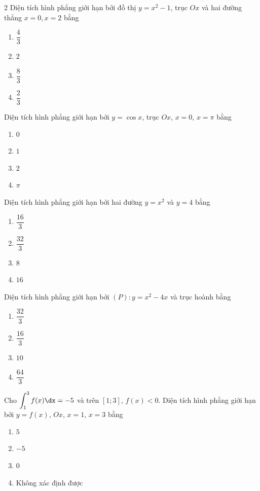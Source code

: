\begin{multicols}{2}
\cauhoi Diện tích hình phẳng giới hạn bởi đồ thị $y=x^2-1$, trục $Ox$ và hai đường thẳng $x=0,x=2$ bằng
\begin{enumerate}[label=\textbf{\Alph*.}, leftmargin=0.9cm]
  \item $\dfrac{4}{3}$
  \item $2$
  \item $\dfrac{8}{3}$
  \item $\dfrac{2}{3}$
\end{enumerate}

\cauhoi Diện tích hình phẳng giới hạn bởi $y=\cos x$, trục $Ox$, $x=0$, $x=\pi$ bằng
\begin{enumerate}[label=\textbf{\Alph*.}, leftmargin=0.9cm]
  \item $0$
  \item $1$
  \item $2$
  \item $\pi$
\end{enumerate}

\cauhoi Diện tích hình phẳng giới hạn bởi hai đường $y=x^2$ và $y=4$ bằng
\begin{enumerate}[label=\textbf{\Alph*.}, leftmargin=0.9cm]
  \item $\dfrac{16}{3}$
  \item $\dfrac{32}{3}$
  \item $8$
  \item $16$
\end{enumerate}

\cauhoi Diện tích hình phẳng giới hạn bởi $(P): y=x^2-4x$ và trục hoành bằng
\begin{enumerate}[label=\textbf{\Alph*.}, leftmargin=0.9cm]
  \item $\dfrac{32}{3}$
  \item $\dfrac{16}{3}$
  \item $10$
  \item $\dfrac{64}{3}$
\end{enumerate}

\cauhoi Cho $\displaystyle\int_1^3 f(x)\dx=-5$ và trên $[1;3]$, $f(x)<0$. Diện tích hình phẳng giới hạn bởi $y=f(x)$, $Ox$, $x=1$, $x=3$ bằng
\begin{enumerate}[label=\textbf{\Alph*.}, leftmargin=0.9cm]
  \item $5$
  \item $-5$
  \item $0$
  \item Không xác định được
\end{enumerate}


\end{multicols}
